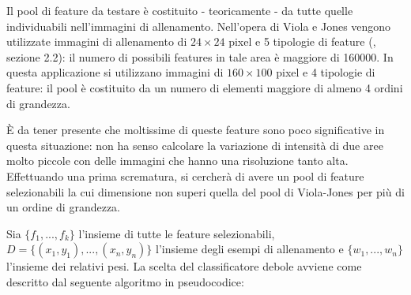             Il pool di feature da testare è costituito - teoricamente - da tutte quelle individuabili nell'immagini di allenamento. Nell'opera di Viola e Jones vengono utilizzate immagini di allenamento di $24 \times 24$ pixel e 5 tipologie di feature (\cite{Viola04}, sezione 2.2): il numero di possibili features in tale area è maggiore di 160000. In questa applicazione si utilizzano immagini di $160 \times 100$ pixel e 4 tipologie di feature: il pool è costituito da un numero di elementi maggiore di almeno 4 ordini di grandezza.

            È da tener presente che moltissime di queste feature sono poco significative in questa situazione: non ha senso calcolare la variazione di intensità di due aree molto piccole con delle immagini che hanno una risoluzione tanto alta. Effettuando una prima scrematura, si cercherà di avere un pool di feature selezionabili la cui dimensione non superi quella del pool di Viola-Jones per più di un ordine di grandezza.

            Sia $\{ f_1,...,f_k\}$ l'insieme di tutte le feature selezionabili, $D = \{(x_1,y_1), ..., (x_n, y_n) \}$ l'insieme degli esempi di allenamento e $\{w_1, ..., w_n\}$ l'insieme dei relativi pesi. La scelta del classificatore debole avviene come descritto dal seguente algoritmo in pseudocodice:

